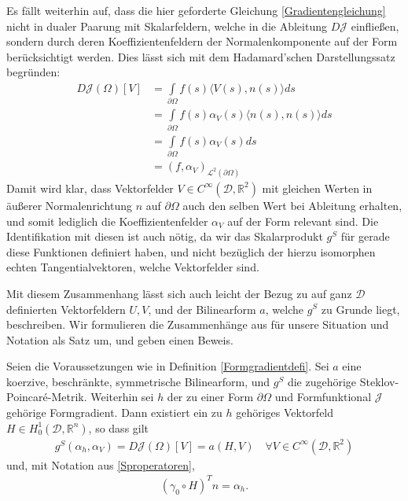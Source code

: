 Es fällt weiterhin auf, dass die hier geforderte Gleichung \ref{Gradientengleichung} nicht in dualer Paarung mit Skalarfeldern, welche in die Ableitung $D\mathcal{J}$ einfließen, sondern durch deren Koeffizientenfeldern der Normalenkomponente auf der Form berücksichtigt werden. Dies lässt sich mit dem Hadamard'schen Darstellungssatz begründen:
\begin{align*}
	D\mathcal{J}(\Omega)[V] &= \underset{\partial\Omega}{\int}f(s)\langle V(s),n(s)\rangle ds \\
	&=\underset{\partial\Omega}{\int}f(s) \alpha_V(s)\langle n(s),n(s)\rangle ds \\
	&=\underset{\partial\Omega}{\int}f(s) \alpha_V(s) ds \\
	&= (f,\alpha_V)_{\mathcal{L}^2(\partial\Omega)}
\end{align*}
Damit wird klar, dass Vektorfelder $V\in C^\infty(\mathcal{D},\mathbb{R}^2)$ mit gleichen Werten in äußerer Normalenrichtung $n$ auf $\partial\Omega$ auch den selben Wert bei Ableitung erhalten, und somit lediglich die Koeffizientenfelder $\alpha_V$ auf der Form relevant sind. Die Identifikation mit diesen ist auch nötig, da wir das Skalarprodukt $g^S$ für gerade diese Funktionen definiert haben, und nicht bezüglich der hierzu isomorphen echten Tangentialvektoren, welche Vektorfelder sind.

Mit diesem Zusammenhang lässt sich auch leicht der Bezug zu auf ganz $\mathcal{D}$ definierten Vektorfeldern $U,V$, und der Bilinearform $a$, welche $g^S$ zu Grunde liegt, beschreiben. Wir formulieren die Zusammenhänge aus \cite{bfgs2} für unsere Situation und Notation als Satz um, und geben einen Beweis. 

\begin{theorem}
Seien die Voraussetzungen wie in Definition \ref{Formgradientdefi}. Sei $a$ eine koerzive, beschränkte, symmetrische Bilinearform, und $g^S$ die zugehörige Steklov-Poincaré-Metrik. Weiterhin sei $h$ der zu einer Form $\partial\Omega$ und Formfunktional $\mathcal{J}$ gehörige Formgradient. Dann existiert ein zu $h$ gehöriges Vektorfeld $H \in H^1_0(\mathcal{D}, \mathbb{R}^n)$, so dass gilt
\begin{equation}
\label{zentraleDeformation}
\begin{aligned}
	g^S(\alpha_h, \alpha_V) = D\mathcal{J}(\Omega)[V] = a(H,V) \quad \forall  V \in C^\infty(\mathcal{D},\mathbb{R}^2)
\end{aligned}
\end{equation}
und, mit Notation aus \ref{Sproperatoren},
\begin{align*}
	(\gamma_0\circ H)^T n = \alpha_h.
\end{align*}
\end{theorem}

